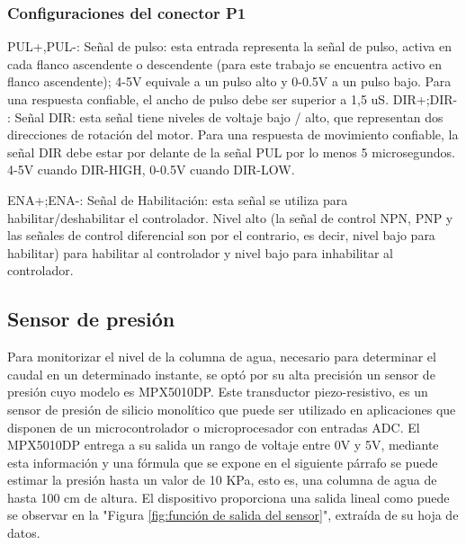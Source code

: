 \subsubsection{Configuraciones del conector P1}
PUL+,PUL-: Señal de pulso: esta entrada representa la señal de pulso, activa en cada flanco ascendente o descendente (para este trabajo se encuentra activo en flanco ascendente); 4-5V equivale a un pulso alto y 0-0.5V a un pulso bajo. Para una respuesta confiable, el ancho de pulso debe ser superior a 1,5 uS. 
DIR+;DIR- : Señal DIR: esta señal tiene niveles de voltaje bajo / alto, que representan dos direcciones de rotación del motor. Para una respuesta de movimiento confiable, la señal DIR debe estar por delante de la señal PUL por lo menos 5 microsegundos. 4-5V cuando DIR-HIGH, 0-0.5V cuando DIR-LOW. 

ENA+;ENA-: Señal de Habilitación: esta señal se utiliza para habilitar/deshabilitar el controlador. Nivel alto (la señal de control NPN, PNP y las señales de control diferencial son por el contrario, es decir, nivel bajo para habilitar) para habilitar al controlador y nivel bajo para inhabilitar al controlador.
\subsection{Sensor de presión}
Para monitorizar el nivel de la columna de agua, necesario para determinar el caudal en un determinado instante, se optó por su alta precisión un sensor de presión cuyo modelo es MPX5010DP. Este transductor piezo-resistivo, es un sensor de presión de silicio monolítico que puede ser utilizado en aplicaciones que disponen de un microcontrolador o microprocesador con entradas ADC.
El MPX5010DP entrega a su salida un rango de voltaje entre 0V y 5V, mediante esta información y una fórmula que se expone en el siguiente párrafo se puede estimar la presión hasta un valor de 10 KPa, esto es, una columna de agua de hasta 100 cm de altura.
El dispositivo proporciona una salida lineal como puede se observar en la "Figura \ref{fig:función de salida del sensor}", extraída de su hoja de datos.

